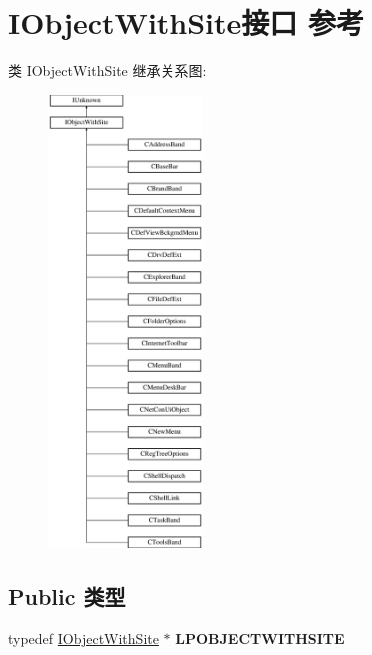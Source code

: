 \hypertarget{interface_i_object_with_site}{}\section{I\+Object\+With\+Site接口 参考}
\label{interface_i_object_with_site}
类 I\+Object\+With\+Site 继承关系图\+:\begin{figure}[H]
\begin{center}
\leavevmode
\includegraphics[height=12.000000cm]{interface_i_object_with_site}
\end{center}
\end{figure}
\subsection*{Public 类型}
\begin{DoxyCompactItemize}
\item 
\mbox{\label{interface_i_object_with_site_ab86c5bd12e3aeffdebeebe2c24f18305}} 
typedef \hyperlink{interface_i_object_with_site}{I\+Object\+With\+Site} $\ast$ {\bfseries L\+P\+O\+B\+J\+E\+C\+T\+W\+I\+T\+H\+S\+I\+TE}
\end{DoxyCompactItemize}
